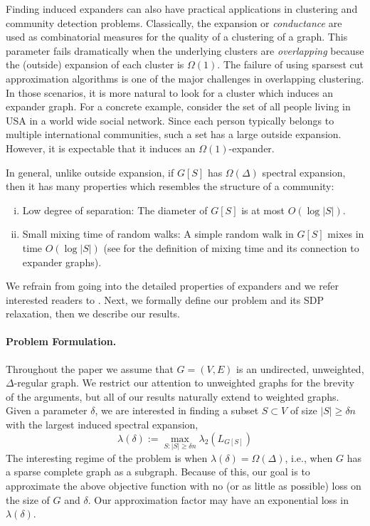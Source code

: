 \documentclass[11pt]{article}
\begin{document}
Finding induced expanders can also have practical applications in clustering and community detection problems. 
Classically, the expansion or \emph{conductance} are used as combinatorial measures for the quality of a clustering of a graph.
This parameter fails dramatically when the underlying clusters are \emph{overlapping} because the (outside) expansion of each cluster is $\Omega(1)$. The failure of using sparsest cut approximation algorithms is one of the major challenges in overlapping clustering. In those scenarios, it is more natural to look for a cluster which induces an expander graph. For a concrete example, consider the set of all people living in USA in a world wide social network. Since each person typically belongs to multiple international communities, such a set has a large outside expansion. However, it is expectable that it  induces an $\Omega(1)$-expander. 

In general, unlike outside expansion, if $G[S]$ has $\Omega(\Delta)$ spectral expansion, then it has many properties which resembles the structure of a community: 
\begin{enumerate}[i)]
\item Low degree of separation: The diameter of $G[S]$ is at most $O(\log |S|)$. 
\item Small mixing time of random walks: A simple random walk in $G[S]$ mixes in time $O(\log |S|)$ (see \cite{LPW06} for the definition of mixing time and its connection to expander graphs).
\end{enumerate}
We refrain from going into the detailed properties of expanders and we refer interested readers to \cite{HLW06}. 
Next,  we formally define our problem and its SDP relaxation, then we describe our results.


\paragraph{Problem Formulation.}
Throughout the paper we assume that $G=(V,E)$ is an  undirected, unweighted, $\Delta$-regular graph.
We restrict our attention to unweighted graphs for the brevity of the arguments, but all of our results naturally extend to weighted graphs.
Given a parameter $\delta$, we are interested in finding a subset $S\subset V$ of size $|S|\geq \delta n$ with the largest induced spectral expansion,
\begin{equation}\label{eq:benchmarkinducedexp} \lambda(\delta) := \max_{S: |S|\geq \delta n} \lambda_2(L_{G[S]})
\end{equation}
The interesting regime of the problem is when $\lambda(\delta)=\Omega(\Delta)$, i.e., when $G$ has a sparse complete graph as a subgraph.
Because of this, our goal is to approximate the above objective function with no (or as little as possible) loss on the size of $G$ and $\delta$. Our approximation factor may have an exponential loss in $\lambda(\delta)$.
\end{document}
